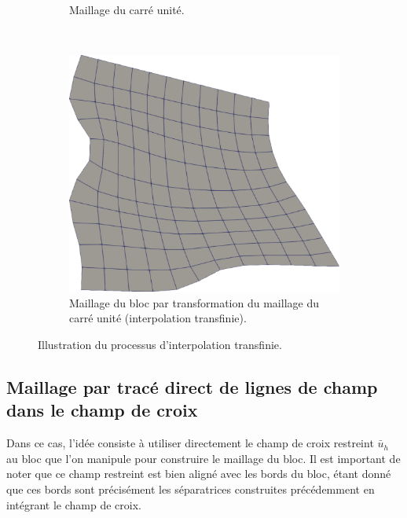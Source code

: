 \begin{figure}[h!]
\begin{subfigure}{0.42\textwidth}
    \caption{Maillage du carré unité.}
    \label{fig:transfini_2}
\end{subfigure}
\\[0.5cm]
\begin{subfigure}{0.5\textwidth}
    \includegraphics[width=\textwidth]{images/transfini_3.pdf}
    \caption{Maillage du bloc par transformation du maillage du carré unité (interpolation transfinie).}
    \label{fig:transfini_3}
\end{subfigure}
\caption{Illustration du processus d'interpolation transfinie.}
\label{fig:transfini}
\end{figure}



\subsection{Maillage par tracé direct de lignes de champ dans le champ de croix}
Dans ce cas, l'idée consiste à utiliser directement le champ de croix restreint $\bar{u}_h$ au bloc que l'on manipule pour construire le maillage du bloc. Il est important de noter que ce champ restreint est bien aligné avec les bords du bloc, étant donné que ces bords sont précisément les séparatrices construites précédemment en intégrant le champ de croix.

